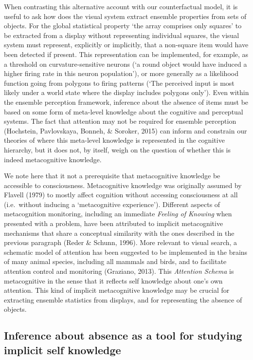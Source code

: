 \documentclass[12pt,twoside]{reedthesis}
\begin{document}
When contrasting this alternative account with our counterfactual model, it is useful to ask how does the visual system extract ensemble properties from sets of objects. For the global statistical property `the array comprises only squares' to be extracted from a display without representing individual squares, the visual system must represent, explicitly or implicitly, that a non-square item would have been detected if present. This representation can be implemented, for example, as a threshold on curvature-sensitive neurons (`a round object would have induced a higher firing rate in this neuron population'), or more generally as a likelihood function going from polygons to firing patterns (`The perceived input is most likely under a world state where the display includes polygons only'). Even within the ensemble perception framework, inference about the absence of items must be based on some form of meta-level knowledge about the cognitive and perceptual systems. The fact that attention may not be required for ensemble perception (Hochstein, Pavlovskaya, Bonneh, \& Soroker, 2015) can inform and constrain our theories of where this meta-level knowledge is represented in the cognitive hierarchy, but it does not, by itself, weigh on the question of whether this is indeed metacognitive knowledge.

We note here that it not a prerequisite that metacognitive knowledge be accessible to consciousness. Metacognitive knowledge was originally assumed by Flavell (1979) to mostly affect cognition without accessing consciousness at all (i.e.~without inducing a `metacognitive experience'). Different aspects of metacognition monitoring, including an immediate \emph{Feeling of Knowing} when presented with a problem, have been attributed to implicit metacognitive mechanisms that share a conceptual similarity with the ones described in the previous paragraph (Reder \& Schunn, 1996). More relevant to visual search, a schematic model of attention has been suggested to be implemented in the brains of many animal species, including all mammals and birds, and to facilitate attention control and monitoring (Graziano, 2013). This \emph{Attention Schema} is metacognitive in the sense that it reflects self knowledge about one's own attention. This kind of implicit metacognitive knowledge may be crucial for extracting ensemble statistics from displays, and for representing the absence of objects.

\hypertarget{inference-about-absence-as-a-tool-for-studying-implicit-self-knowledge}{%
\subsection{Inference about absence as a tool for studying implicit self knowledge}\label{inference-about-absence-as-a-tool-for-studying-implicit-self-knowledge}}
\end{document}
